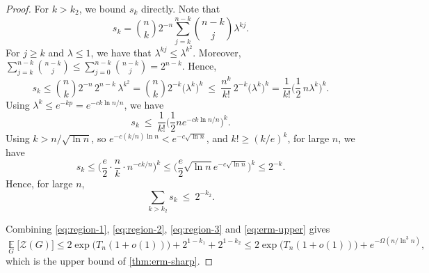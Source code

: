 \documentclass{article}
\theoremstyle{plain}
\theoremstyle{definition}
\theoremstyle{remark}
\begin{document}
\begin{proof}
\medskip
\noindent
For $k>k_2$, we bound $s_k$ directly. Note that
\begin{equation}
s_k=\binom nk2^{-n}\sum_{j=k}^{n-k}\binom{n-k}{j}\lambda^{kj}.
\end{equation}
For $j\geq k$ and $\lambda\leq 1$, we have that $\lambda^{kj}\leq\lambda^{k^2}$. Moreover, $\sum\limits_{j=k}^{n-k}\binom{n-k}{j}\leq \sum\limits_{j=0}^{n-k}\binom{n-k}{j}=2^{n-k}$. Hence,
\begin{equation}
s_k \leq \binom nk2^{-n}\,2^{n-k}\,\lambda^{k^2}=\binom nk2^{-k}\big(\lambda^k\big)^k\ \le\ \frac{n^k}{k!}\,2^{-k}\big(\lambda^k\big)^k=\frac1{k!}\Big(\frac12\,n\lambda^k\Big)^k .
\end{equation}
Using $\lambda^k\le e^{-kp}=e^{-ck\ln n/n}$, we have
\begin{equation*}
s_k\ \le\ \frac1{k!}\Big(\frac12 n e^{-ck\ln n/n}\Big)^k .
\end{equation*}
Using $k > n/\sqrt{\ln n}$, so $e^{-c(k/n)\ln n}<e^{-c\sqrt{\ln n}}$, and $k!\ge(k/e)^k$, for large $n$, we have 
\begin{equation}
s_k \leq \Big(\frac e2\cdot\frac nk\cdot n^{-ck/n}\Big)^k \leq \Big(\frac e2\sqrt{\ln n} e^{-c\sqrt{\ln n}}\Big)^k \leq 2^{-k}.
\end{equation} Hence, for large $n$,
\begin{equation}\label{eq:region-3}
\sum_{k>k_2}s_k\ \le\ 2^{-k_2}.
\end{equation}

Combining \eqref{eq:region-1}, \eqref{eq:region-2}, \eqref{eq:region-3} and \eqref{eq:erm-upper} gives
\begin{equation}
\operatorname*{\mathbb{E}}_G\big[\mathcal Z(G)\big] \leq 2\exp\big(T_n(1+o(1))\big)+2^{1-k_1}+2^{1-k_2}
\leq 2\exp\big(T_n(1+o(1))\big)+e^{-\Omega(n/\ln^3n)},
\end{equation}
which is the upper bound of \cref{thm:erm-sharp}.


\end{proof}
\end{document}
